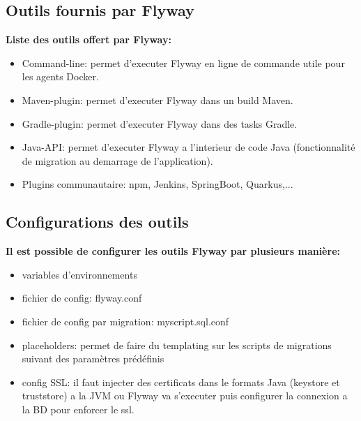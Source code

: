 \documentclass[slidestop,compress,11pt,xcolor=dvipsnames,french]{beamer}
\begin{document}
\subsection*{Outils fournis par Flyway}
\begin{frame}
\vspace{1cm}
\textbf {Liste des outils offert par Flyway: \\}
    \begin{itemize}
        \item Command-line: permet d'executer Flyway en ligne de commande utile pour les agents Docker.
        \item Maven-plugin: permet d'executer Flyway dans un build Maven.
        \item Gradle-plugin: permet d'executer Flyway dans des tasks Gradle.
        \item Java-API: permet d'executer Flyway a l'interieur de code Java (fonctionnalité de migration au demarrage de l'application).
        \item Plugins communautaire: npm, Jenkins, SpringBoot, Quarkus,...
    \end{itemize}
\end{frame} 

\subsection*{Configurations des outils}
\begin{frame}
\vspace{1cm}
\textbf {Il est possible de configurer les outils Flyway par plusieurs manière: \\}
    \begin{itemize}
        \item variables d'environnements 
        \item fichier de config: flyway.conf
        \item fichier de config par migration: myscript.sql.conf 
        \item placeholders: permet de faire du templating sur les scripts de migrations suivant des paramètres prédéfinis
        \item config SSL: il faut injecter des certificats dans le formats Java (keystore et truststore) a la JVM ou Flyway va s'executer puis configurer la connexion a la BD pour enforcer le ssl.
    \end{itemize}
\end{frame} 
\end{document}
